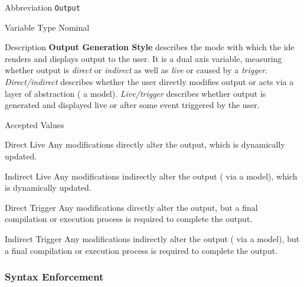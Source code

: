 \begin{AlignedDesc}
  \item[Abbreviation] \texttt{Output}

  \item[Variable Type] Nominal

  \item[Description] \textbf{Output Generation Style} describes the mode
  with which the \ac{ide} renders and displays output to the user. It is a
  dual axis variable, measuring whether output is \textit{direct} or
  \textit{indirect} as well as \textit{live} or caused by a
  \textit{trigger}. \textit{Direct/indirect} describes whether the user directly
  modifies output or acts via a layer of abstraction (\eg{} a
  model). \textit{Live/trigger} describes whether output is generated and
  displayed live or after some event triggered by the user.

  \item[Accepted Values]

  \begin{AlignedDesc}
    \item[Direct Live] Any modifications directly alter the output, which
    is dynamically updated.
    \item[Indirect Live] Any modifications indirectly alter the output
    (\eg{} via a model), which is dynamically updated.
    \item[Direct Trigger] Any modifications directly alter the output, but
    a final compilation or execution process is required to complete the
    output.
    \item[Indirect Trigger] Any modifications indirectly alter the output
    (\eg{} via a model), but a final compilation or execution process is
    required to complete the output.
  \end{AlignedDesc}

\end{AlignedDesc}

\subsubsection{Syntax Enforcement}
\label{subsubsec:syntax}

